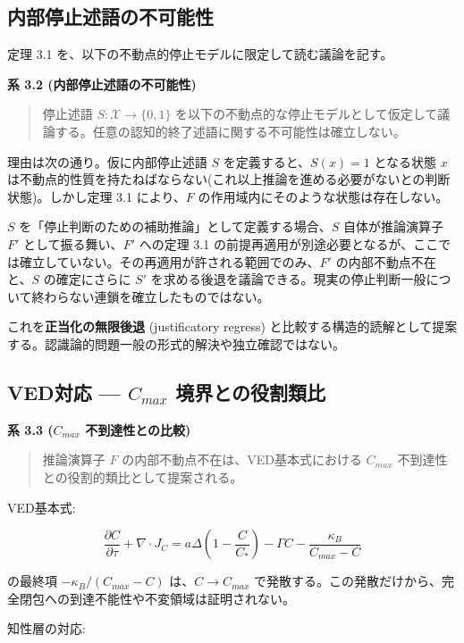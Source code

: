 \subsection{内部停止述語の不可能性}


定理 3.1 を、以下の不動点的停止モデルに限定して読む議論を記す。

\textbf{系 3.2 (内部停止述語の不可能性)}

\begin{quote}
停止述語 $S: \mathcal{X} \to \{0, 1\}$ を以下の不動点的な停止モデルとして仮定して議論する。任意の認知的終了述語に関する不可能性は確立しない。
\end{quote}


理由は次の通り。仮に内部停止述語 $S$ を定義すると、$S(x) = 1$ となる状態 $x$ は不動点的性質を持たねばならない(これ以上推論を進める必要がないとの判断状態)。しかし定理 3.1 により、$F$ の作用域内にそのような状態は存在しない。

$S$ を「停止判断のための補助推論」として定義する場合、$S$ 自体が推論演算子 $F'$ として振る舞い、$F'$ への定理 3.1 の前提再適用が別途必要となるが、ここでは確立していない。その再適用が許される範囲でのみ、$F'$ の内部不動点不在と、$S$ の確定にさらに $S'$ を求める後退を議論できる。現実の停止判断一般について終わらない連鎖を確立したものではない。

これを\textbf{正当化の無限後退} (justificatory regress) と比較する構造的読解として提案する。認識論的問題一般の形式的解決や独立確認ではない。

\bigskip


\subsection{VED対応 — $C_{max}$ 境界との役割類比}


\textbf{系 3.3 ($C_{max}$ 不到達性との比較)}

\begin{quote}
推論演算子 $F$ の内部不動点不在は、VED基本式における $C_{max}$ 不到達性との役割的類比として提案される。
\end{quote}


VED基本式:

\[
\frac{\partial C}{\partial \tau} + \nabla \cdot J_C = a\Delta\left(1 - \frac{C}{C_*}\right) - \Gamma C - \frac{\kappa_B}{C_{max} - C}
\]

の最終項 $-\kappa_B/(C_{max} - C)$ は、$C \to C_{max}$ で発散する。この発散だけから、完全閉包への到達不能性や不変領域は証明されない。

知性層の対応:


